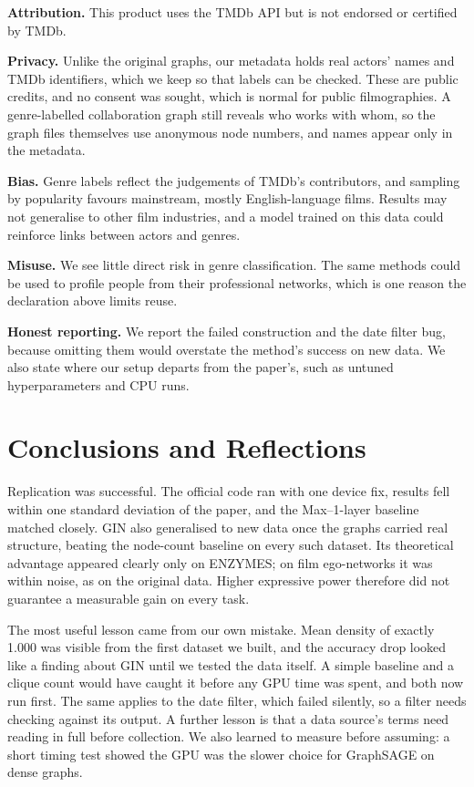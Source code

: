 \documentclass[11pt]{article}
\begin{document}
\textbf{Attribution.} This product uses the TMDb API but is not endorsed or certified by TMDb.

\textbf{Privacy.} Unlike the original graphs, our metadata holds real actors' names and TMDb identifiers, which we keep so that labels can be checked. These are public credits, and no consent was sought, which is normal for public filmographies. A genre-labelled collaboration graph still reveals who works with whom, so the graph files themselves use anonymous node numbers, and names appear only in the metadata.

\textbf{Bias.} Genre labels reflect the judgements of TMDb's contributors, and sampling by popularity favours mainstream, mostly English-language films. Results may not generalise to other film industries, and a model trained on this data could reinforce links between actors and genres.

\textbf{Misuse.} We see little direct risk in genre classification. The same methods could be used to profile people from their professional networks, which is one reason the declaration above limits reuse.

\textbf{Honest reporting.} We report the failed construction and the date filter bug, because omitting them would overstate the method's success on new data. We also state where our setup departs from the paper's, such as untuned hyperparameters and CPU runs.

\section{Conclusions and Reflections}
\label{sec:conclusion}

Replication was successful. The official code ran with one device fix, results fell within one standard deviation of the paper, and the Max--1-layer baseline matched closely. GIN also generalised to new data once the graphs carried real structure, beating the node-count baseline on every such dataset. Its theoretical advantage appeared clearly only on ENZYMES; on film ego-networks it was within noise, as on the original data. Higher expressive power therefore did not guarantee a measurable gain on every task.

The most useful lesson came from our own mistake. Mean density of exactly 1.000 was visible from the first dataset we built, and the accuracy drop looked like a finding about GIN until we tested the data itself. A simple baseline and a clique count would have caught it before any GPU time was spent, and both now run first. The same applies to the date filter, which failed silently, so a filter needs checking against its output. A further lesson is that a data source's terms need reading in full before collection. We also learned to measure before assuming: a short timing test showed the GPU was the slower choice for GraphSAGE on dense graphs.
\end{document}
